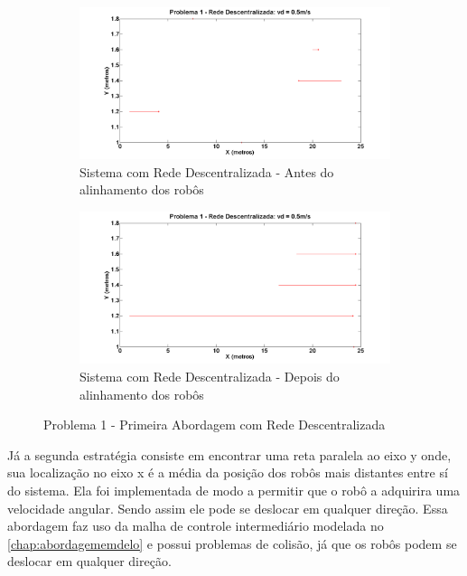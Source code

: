 \begin{figure}[!htb]
	\centering
	\begin{subfigure}{.5\textwidth}
		\centering
		\includegraphics[width=.9\linewidth]{./04-figuras/Simulacoes/Problema1-Abordagem1/P1_A1_Desc_Inicio}
		\caption{Sistema com Rede Descentralizada - Antes do alinhamento dos robôs}
		\label{fig:P1DIni}
	\end{subfigure}%
	\begin{subfigure}{.5\textwidth}
		\centering
		\includegraphics[width=.9\linewidth]{./04-figuras/Simulacoes/Problema1-Abordagem1/P1_A1_Desc_Fim}
		\caption{Sistema com Rede Descentralizada - Depois do alinhamento dos robôs}
		\label{fig:P1DFim}
	\end{subfigure}
	\caption{Problema 1 - Primeira Abordagem com Rede Descentralizada}
	\label{fig:sP1Desc}
\end{figure}

Já a segunda estratégia consiste em encontrar uma reta paralela ao eixo y onde, sua localização no eixo x é a média da posição dos robôs mais distantes entre sí do sistema. Ela foi implementada de modo a permitir que o robô a adquirira uma velocidade angular. Sendo assim ele pode se deslocar em qualquer direção. Essa abordagem faz uso da malha de controle intermediário modelada no \autoref{chap:abordagememdelo} e possui problemas de colisão, já que os robôs podem se deslocar em qualquer direção.

